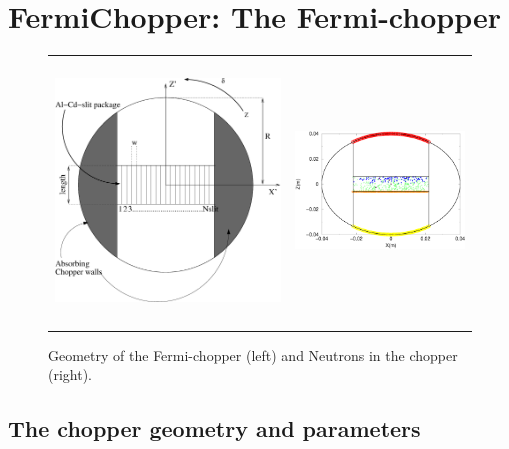 \section{FermiChopper: The Fermi-chopper}


\begin{figure}
\begin{center}
\begin{tabular}{cc}
\includegraphics[height=7cm]{./figures/FCChoppergeo.eps}
&
\includegraphics[height=5cm,width=5.3cm]{./figures/FCOverview.eps}
\end{tabular}
\end{center}
\caption{Geometry of the Fermi-chopper (left) and Neutrons in the chopper (right).}
\label{fig:Overview.eps}
\end{figure}

\subsection{The chopper geometry and parameters}
\label{ssec:chopper}

